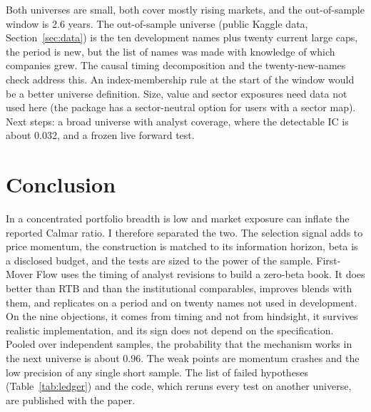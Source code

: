  Both universes are small, both cover mostly rising markets, and the out-of-sample window is 2.6 years. The out-of-sample universe (public Kaggle data, Section~\ref{sec:data}) is the ten development names plus twenty current large caps, the period is new, but the list of names was made with knowledge of which companies grew. The causal timing decomposition and the twenty-new-names check address this. An index-membership rule at the start of the window would be a better universe definition. Size, value and sector exposures need data not used here (the package has a sector-neutral option for users with a sector map). Next steps: a broad universe with analyst coverage, where the detectable IC is about 0.032, and a frozen live forward test.

\section{Conclusion}\label{sec:conclusion}

In a concentrated portfolio breadth is low and market exposure can inflate the reported Calmar ratio. I therefore separated the two. The selection signal adds to price momentum, the construction is matched to its information horizon, beta is a disclosed budget, and the tests are sized to the power of the sample. First-Mover Flow uses the timing of analyst revisions to build a zero-beta book. It does better than RTB and than the institutional comparables, improves blends with them, and replicates on a period and on twenty names not used in development. On the nine objections, it comes from timing and not from hindsight, it survives realistic implementation, and its sign does not depend on the specification. Pooled over independent samples, the probability that the mechanism works in the next universe is about 0.96.
The weak points are momentum crashes and the low precision of any single short sample. The list of failed hypotheses (Table~\ref{tab:ledger}) and the code, which reruns every test on another universe, are published with the paper.

